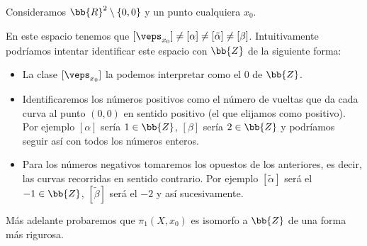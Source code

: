 \begin{ejemplo} Consideramos $\bb{R}^2\setminus \{0,0\}$ y un punto cualquiera $x_0$.

    \begin{figure}[H]
        \centering
    \end{figure}%

    En este espacio tenemos que $[\veps_{x_0}] \neq [\alpha] \neq [\tilde{\alpha}] \neq [\beta]$. Intuitivamente podríamos intentar identificar este espacio con $\bb{Z}$ de la siguiente forma:
    
    \begin{itemize}
        \item La clase $[\veps_{x_0}]$ la podemos interpretar como el $0$ de $\bb{Z}$.
        \item Identificaremos los números positivos como el número de vueltas que da cada curva al punto $(0,0)$ en sentido positivo (el que elijamos como positivo). Por ejemplo $[\alpha]$ sería $1\in \bb{Z}$, $[\beta]$ sería $2\in \bb{Z}$ y podríamos seguir así con todos los números enteros.
        \item Para los números negativos tomaremos los opuestos de los anteriores, es decir, las curvas recorridas en sentido contrario. Por ejemplo $[\tilde{\alpha}]$ será el $-1\in \bb{Z}$, $[\tilde{\beta}]$ será el $-2$ y así sucesivamente. 
    \end{itemize}

    Más adelante probaremos que $\pi_1(X,x_0)$ es isomorfo a $\bb{Z}$ de una forma más rigurosa.
\end{ejemplo}

